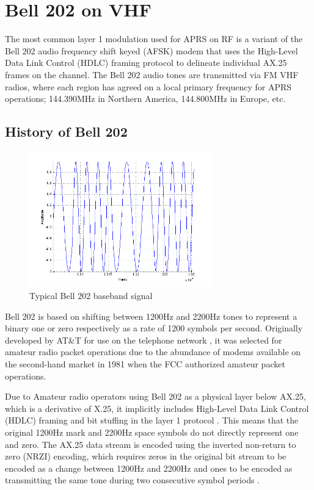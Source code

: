\chapter{Bell 202 on VHF}

The most common layer 1 modulation used for APRS on RF is a variant of the
Bell 202 audio frequency shift keyed (AFSK) modem 
that uses the High-Level Data Link Control (HDLC) framing protocol
to delineate individual AX.25 frames on the channel.
The Bell 202 audio tones are transmitted via 
FM VHF radios, where each region has agreed on a local primary frequency for
APRS operations; 144.390MHz in Northern America, 144.800MHz in Europe, etc.

\section{History of Bell 202}
\label{sec:bell202history}

\begin{figure}
	\centering
	\includegraphics[width=0.7\textwidth]{src/bell202sample}
	\caption{Typical Bell 202 baseband signal}
	\label{fig:bell202sample}
\end{figure}

Bell 202 is based on shifting between 1200Hz and 2200Hz tones to
represent a binary one or zero respectively as a rate of 
1200 symbols per second.
Originally developed by AT\&T for use on the telephone network \cite{202tspec},
it was selected for amateur radio packet operations due to the abundance
of modems available on the second-hand market in 1981 when the FCC authorized
amateur packet operations.

Due to Amateur radio operators
using Bell 202 as a physical layer below AX.25, which is a derivative of
X.25, it implicitly includes High-Level Data Link Control (HDLC) 
framing and bit stuffing in the layer 1 protocol \cite{n1vgphy}.
This means that the original 1200Hz mark and 2200Hz space symbols
do not directly represent one and zero.
The AX.25 data stream is encoded using the 
inverted non-return to zero (NRZI) encoding,
which requires zeros in the original bit stream to be encoded as a change
between 1200Hz and 2200Hz and ones to be encoded as transmitting the same
tone during two consecutive symbol periods \cite{iso13239}.

